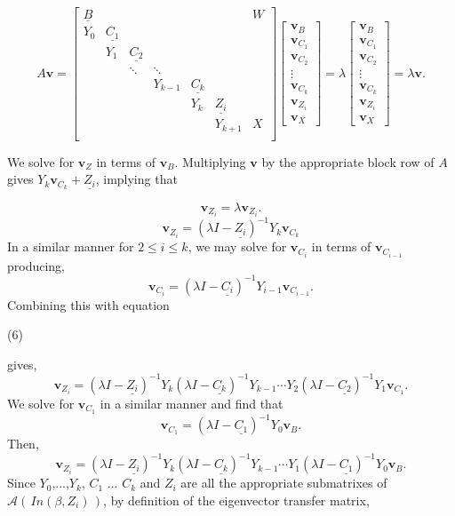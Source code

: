 \documentclass{paper}
\begin{document}
\[
A\mathbf{v} = 
\begin{bmatrix}
\underline{B} & & & & & & W\\
Y_0 & \underline{C_1} \\
    & Y_1 	& \underline{C_2} \\
    &     	& \ddots 	& \ddots \\
    &  	  	&		 	&	Y_{k-1} 	& \underline{C_k}\\

  &  &  	  	&		 	&	Y_k 	& \underline{Z_i}\\
  &  &		&			&		& Y_{k+1} & X \\
\end{bmatrix}
\begin{bmatrix}
\mathbf{v}_B \\ 
\mathbf{v}_{C_1}\\
\mathbf{v}_{C_2}\\

\vdots \\
\mathbf{v}_{C_k}\\
\mathbf{v}_{{Z_{i}}} \\
\mathbf{v}_{X}
\end{bmatrix}
= \lambda
\begin{bmatrix}
\mathbf{v}_B \\ 
\mathbf{v}_{C_1}\\
\mathbf{v}_{C_2}\\

\vdots \\
\mathbf{v}_{C_k}\\
\mathbf{v}_{{Z_{i}}} \\
\mathbf{v}_{X}
\end{bmatrix}
=\lambda \mathbf{v}.
\]

We solve for $\mathbf{v}_Z$ in terms of $\mathbf{v}_B$. Multiplying $\mathbf{v}$ by the appropriate block row of $A$ gives $Y_k \mathbf{v}_{C_k} + \underline{Z_i}$, implying that

\[
\mathbf{v}_{Z_{i}} = \lambda \mathbf{v}_{Z_{i}}.
\]
\begin{equation}
\mathbf{v}_{Z_i} = (\lambda I - \underline{Z_i})^{-1} Y_k \mathbf{v}_{C_k}
\end{equation}
In a similar manner for $2\leq i \leq k$, we may solve for $\mathbf{v}_{C_i}$ in terms of $\mathbf{v}_{C_{i-1}}$ producing,
\[
\mathbf{v}_{C_i} = (\lambda I - \underline{C_{i}})^{-1} Y_{i-1} \mathbf{v}_{C_{i-1}}.
\]
Combining this with equation \begin{bf}(6)\end{bf} gives,
\[
\mathbf{v}_{Z_i} = (\lambda I - \underline{Z_i})^{-1} Y_k (\lambda I - \underline{C_{k}})^{-1} Y_{k-1} \cdots Y_{2}(\lambda I - \underline{C_{2}})^{-1}Y_{1}\mathbf{v}_{C_{1}}.
\]
We solve for $\mathbf{v}_{C_{1}}$ in a similar manner and find that
\[
\mathbf{v}_{C_{1}} = (\lambda I - \underline{C_1})^{-1}Y_0 \mathbf{v}_{B}.
\]
Then, 
\[
\mathbf{v}_{Z_i} = (\lambda I - \underline{Z_i})^{-1} Y_k (\lambda I - \underline{C_{k}})^{-1} Y_{k-1} \cdots Y_{1}(\lambda I - \underline{C_{1}})^{-1}Y_{0}\mathbf{v}_{B}.
\]
Since $Y_0$,...,$Y_k$, $C_1$ ... $C_k$ and $Z_i$ are all the appropriate submatrixes of $\mathcal{A}(\, In(\beta,Z_i)\,)$, by definition of the eigenvector transfer matrix, 
\end{document}
